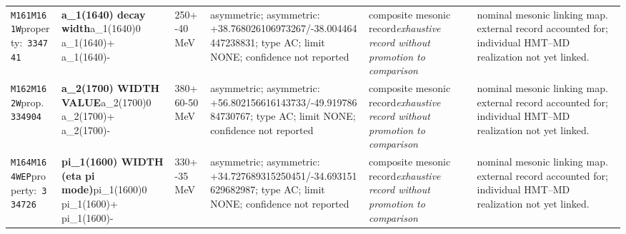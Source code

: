 \begin{landscape}
\begin{longtable}{L{1.85cm}L{4.45cm}L{2.35cm}L{4.05cm}L{3.35cm}L{7.15cm}}
\texttt{M161}\newline \texttt{M161W}\newline property:\ \texttt{334741} & \textbf{a\_\allowbreak{}1(1640) decay width}\newline a\_\allowbreak{}1(1640)0 \textbar{}\allowbreak{} a\_\allowbreak{}1(1640)+ \textbar{}\allowbreak{} a\_\allowbreak{}1(1640)- & 250+-40\,MeV & asymmetric; asymmetric: +38.768026106973267/-38.004464447238831; type AC; limit NONE; confidence not reported & composite mesonic record\newline \emph{exhaustive record without promotion to comparison} & nominal mesonic linking map. external record accounted for; individual HMT--MD realization not yet linked. \\
\texttt{M162}\newline \texttt{M162W}\newline prop.\ \texttt{334904} & \textbf{a\_\allowbreak{}2(1700) WIDTH VALUE}\newline a\_\allowbreak{}2(1700)0 \textbar{}\allowbreak{} a\_\allowbreak{}2(1700)+ \textbar{}\allowbreak{} a\_\allowbreak{}2(1700)- & 380+60-50\,MeV & asymmetric; asymmetric: +56.802156616143733/-49.91978684730767; type AC; limit NONE; confidence not reported & composite mesonic record\newline \emph{exhaustive record without promotion to comparison} & nominal mesonic linking map. external record accounted for; individual HMT--MD realization not yet linked. \\
\texttt{M164}\newline \texttt{M164WEP}\newline property:\ \texttt{334726} & \textbf{pi\_\allowbreak{}1(1600) WIDTH (eta pi mode)}\newline pi\_\allowbreak{}1(1600)0 \textbar{}\allowbreak{} pi\_\allowbreak{}1(1600)+ \textbar{}\allowbreak{} pi\_\allowbreak{}1(1600)- & 330+-35\,MeV & asymmetric; asymmetric: +34.727689315250451/-34.693151629682987; type AC; limit NONE; confidence not reported & composite mesonic record\newline \emph{exhaustive record without promotion to comparison} & nominal mesonic linking map. external record accounted for; individual HMT--MD realization not yet linked. \\

\end{longtable}
\end{landscape}
